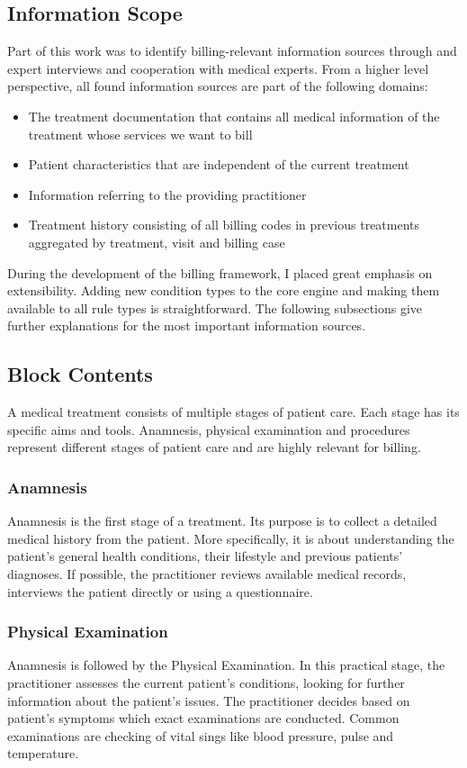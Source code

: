 \subsection{Information Scope}
Part of this work was
to identify billing-relevant information sources through and expert interviews and cooperation with medical experts.
From a higher level perspective, all found information sources are part of the following domains:
\begin{itemize}
    \item
    The treatment documentation that contains all medical information of the treatment whose services we want to bill
    \item Patient characteristics that are independent of the current treatment
    \item Information referring to the providing practitioner
    \item Treatment history consisting of all billing codes in previous treatments aggregated by treatment,
    visit and billing case
\end{itemize}
During the development of the billing framework, I placed great emphasis on extensibility.
Adding new condition types to the core engine and making them available to all rule types is straightforward.
The following subsections give further explanations for the most important information sources.

\subsection{Block Contents}
A medical treatment consists of multiple stages of patient care.
Each stage has its specific aims and tools.
Anamnesis,
physical examination and procedures represent different stages of patient care and are highly relevant for billing.

\subsubsection{Anamnesis}
Anamnesis is the first stage of a treatment.
Its purpose is to collect a detailed medical history from the patient\cite{lino2021medical}.
More specifically, it is about understanding the patient's general health conditions,
their lifestyle and previous patients' diagnoses.
If possible, the practitioner reviews available medical records,
interviews the patient directly or using a questionnaire\cite{zhang2011anamnevis}.

\subsubsection{Physical Examination}
Anamnesis is followed by the Physical Examination.
In this practical stage, the practitioner assesses the current patient's conditions,
looking for further information about the patient's issues\cite{seidel2010mosby}.
The practitioner decides based on patient's symptoms which exact examinations are conducted.
Common examinations are checking of vital sings like blood pressure, pulse and temperature.

